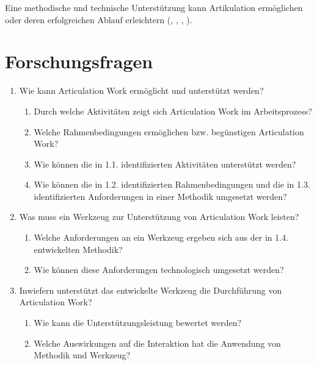 Eine methodische und technische Unterstützung kann Artikulation ermöglichen oder deren erfolgreichen Ablauf erleichtern (\cite{Schmidt92}, \cite{Simone99}, \cite{Jorgensen04}, \cite{Baker07}).


\section{Forschungsfragen} %
\label{sec:forschungsfragen}

\begin{enumerate}
	\item Wie kann Articulation Work ermöglicht und unterstützt werden?
		\begin{enumerate}
			\item Durch welche Aktivitäten zeigt sich Articulation Work im Arbeitsprozess?
			\item Welche Rahmenbedingungen ermöglichen bzw. begünstigen Articulation Work?
			\item Wie können die in 1.1. identifizierten Aktivitäten unterstützt werden?
			\item Wie können die in 1.2. identifizierten Rahmenbedingungen und die in 1.3. identifizierten Anforderungen in einer Methodik umgesetzt werden?
		\end{enumerate}
	\item Was muss ein Werkzeug zur Unterstützung von Articulation Work leisten?
		\begin{enumerate}
			\item Welche Anforderungen an ein Werkzeug ergeben sich aus der in 1.4. entwickelten Methodik?
			\item Wie können diese Anforderungen technologisch umgesetzt werden?
		\end{enumerate}
	\item Inwiefern unterstützt das entwickelte Werkzeug die Durchführung von Articulation Work?
		\begin{enumerate}
			\item Wie kann die Unterstützungsleistung bewertet werden?
			\item Welche Auswirkungen auf die Interaktion hat die Anwendung von Methodik und Werkzeug?
		\end{enumerate}
\end{enumerate}


